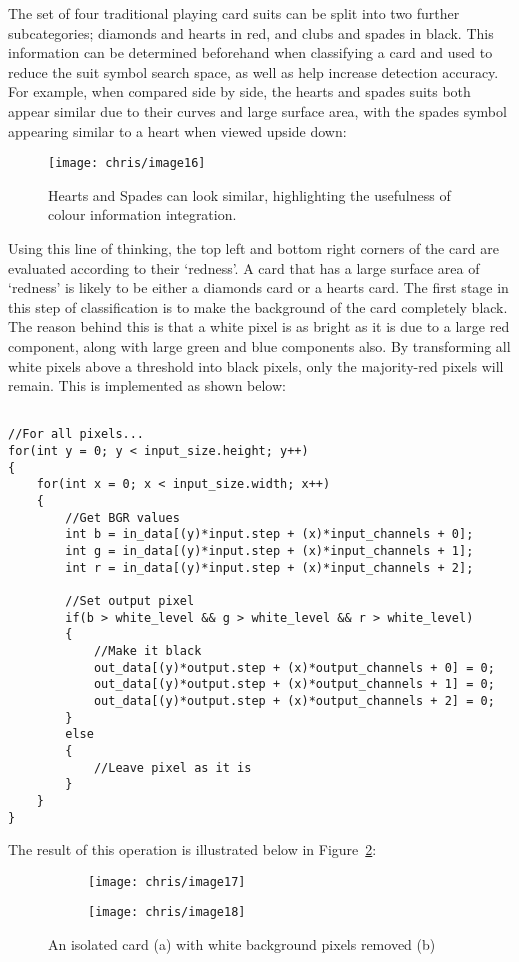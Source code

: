 		The set of four traditional playing card suits can be split into two further subcategories; diamonds and hearts in red, and clubs and spades in black. This information can be determined beforehand when classifying a card and used to reduce the suit symbol search space, as well as help increase detection accuracy. For example, when compared side by side, the hearts and spades suits both appear similar due to their curves and large surface area, with the spades symbol appearing similar to a heart when viewed upside down:

		\begin{figure}[H]
			\centering
			\texttt{[image: chris/image16]}
			\caption{Hearts and Spades can look similar, highlighting the usefulness of colour information integration.}
			\label{fig:colours}
		\end{figure}

		Using this line of thinking, the top left and bottom right corners of the card are evaluated according to their `redness'. A card that has a large surface area of `redness' is likely to be either a diamonds card or a hearts card. The first stage in this step of classification is to make the background of the card completely black. The reason behind this is that a white pixel is as bright as it is due to a large red component, along with large green and blue components also. By transforming all white pixels above a threshold into black pixels, only the majority-red pixels will remain. This is implemented as shown below:
		
		\begin{lstlisting}

//For all pixels...
for(int y = 0; y < input_size.height; y++)
{
	for(int x = 0; x < input_size.width; x++)
	{
		//Get BGR values
		int b = in_data[(y)*input.step + (x)*input_channels + 0];
		int g = in_data[(y)*input.step + (x)*input_channels + 1];
		int r = in_data[(y)*input.step + (x)*input_channels + 2];

		//Set output pixel
		if(b > white_level && g > white_level && r > white_level)
		{
			//Make it black
			out_data[(y)*output.step + (x)*output_channels + 0] = 0;
			out_data[(y)*output.step + (x)*output_channels + 1] = 0;
			out_data[(y)*output.step + (x)*output_channels + 2] = 0;
		}
		else
		{
			//Leave pixel as it is
		}
	}
}
		\end{lstlisting}

		The result of this operation is illustrated below in Figure~\ref{fig:whitebg}:
		\begin{figure}[H]
			\centering
			\begin{subfigure}[b]{0.4\textwidth}
				\centering
				\texttt{[image: chris/image17]}
				\caption{}
			\end{subfigure}
			\begin{subfigure}[b]{0.4\textwidth}
				\centering
				\texttt{[image: chris/image18]}
				\caption{}
			\end{subfigure}
			\caption{An isolated card (a) with white background pixels removed (b)}
			\label{fig:whitebg}
		\end{figure}

